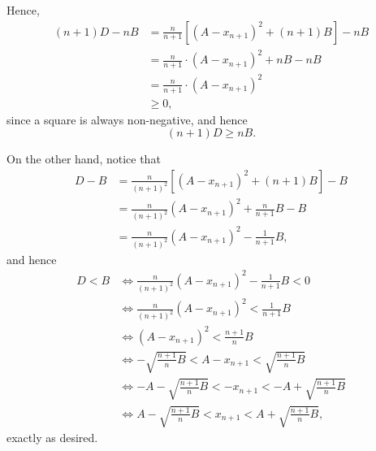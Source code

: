 \begin{enumerate}
          Hence,
          \begin{align*}
              (n + 1)D - nB & = \frac{n}{n + 1} \left[\left(A - x_{n + 1}\right)^2 + (n + 1)B\right] - nB \\
                            & = \frac{n}{n + 1} \cdot \left(A - x_{n + 1}\right)^2 + nB - nB              \\
                            & = \frac{n}{n + 1} \cdot \left(A - x_{n + 1}\right)^2                        \\
                            & \geq 0,
          \end{align*}
          since a square is always non-negative, and hence
          \[
              (n + 1)D \geq nB.
          \]

          On the other hand, notice that
          \begin{align*}
              D - B & = \frac{n}{(n + 1)^2} \left[\left(A - x_{n + 1}\right)^2 + (n + 1)B\right] - B \\
                    & = \frac{n}{(n + 1)^2} \left(A - x_{n + 1}\right)^2 + \frac{n}{n + 1} B - B     \\
                    & =\frac{n}{(n + 1)^2} \left(A - x_{n + 1}\right)^2 - \frac{1}{n + 1}B,
          \end{align*}
          and hence
          \begin{align*}
              D < B & \iff \frac{n}{(n + 1)^2} \left(A - x_{n + 1}\right)^2 - \frac{1}{n + 1}B < 0       \\
                    & \iff \frac{n}{(n + 1)^2} \left(A - x_{n + 1}\right)^2 < \frac{1}{n + 1}B           \\
                    & \iff \left(A - x_{n + 1}\right)^2 < \frac{n + 1}{n} B                              \\
                    & \iff - \sqrt{\frac{n + 1}{n} B} < A - x_{n + 1} < \sqrt{\frac{n + 1}{n} B}         \\
                    & \iff - A - \sqrt{\frac{n + 1}{n} B} < - x_{n + 1} < - A + \sqrt{\frac{n + 1}{n} B} \\
                    & \iff A - \sqrt{\frac{n + 1}{n} B} < x_{n + 1} < A + \sqrt{\frac{n + 1}{n} B},
          \end{align*}
          exactly as desired.
\end{enumerate}